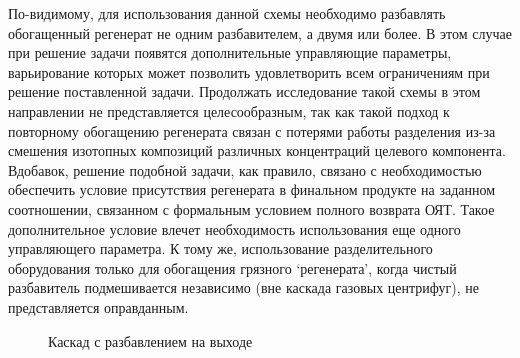 По-видимому, для использования данной схемы необходимо разбавлять обогащенный регенерат не одним разбавителем, а двумя или более. В этом случае при решение задачи появятся дополнительные управляющие параметры, варьирование которых может позволить удовлетворить всем ограничениям
при решение поставленной задачи. Продолжать исследование такой схемы в этом направлении не представляется целесообразным, так как такой подход к повторному обогащению регенерата связан с потерями работы разделения из-за смешения изотопных композиций различных концентраций целевого компонента. Вдобавок, решение подобной задачи, как правило, связано с необходимостью обеспечить условие присутствия регенерата в финальном продукте на заданном соотношении, связанном с формальным условием полного возврата ОЯТ. Такое дополнительное условие влечет необходимость использования еще одного управляющего параметра. К тому же, использование разделительного оборудования только для обогащения грязного `регенерата', когда чистый разбавитель подмешивается независимо (вне каскада газовых центрифуг), не представляется оправданным.

\begin{figure}[ht]
  \caption{Каскад с разбавлением на выходе}\label{fig:Terminal_Dilution}
\end{figure}

